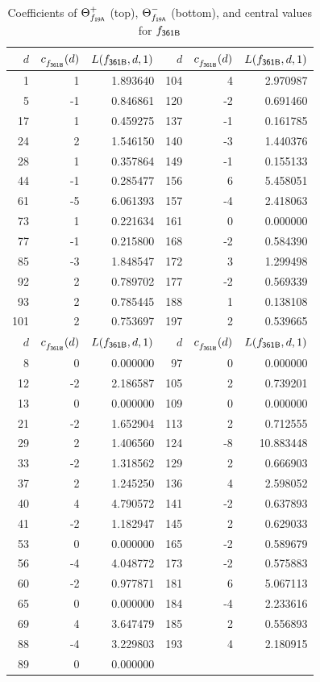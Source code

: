 \begin{table}
\begin{tabular}{||r|rr||r|rr||}
\hline
$d$ & $c^{}_{f_\mathsf{{361B}}}(d)$ & $L(f_\mathsf{{361B}},d,1)$& $d$ & $c^{}_{f_\mathsf{{361B}}}(d)$ & $L(f_\mathsf{{361B}},d,1)$\\
\hline
   1 & 1 & 1.893640 & 104 & 4 & 2.970987 \\
   5 & -1 & 0.846861 & 120 & -2 & 0.691460 \\
   17 & 1 & 0.459275 & 137 & -1 & 0.161785 \\
   24 & 2 & 1.546150 & 140 & -3 & 1.440376 \\
   28 & 1 & 0.357864 & 149 & -1 & 0.155133 \\
   44 & -1 & 0.285477 & 156 & 6 & 5.458051 \\
   61 & -5 & 6.061393 & 157 & -4 & 2.418063 \\
   73 & 1 & 0.221634 & 161 & 0 & 0.000000 \\
   77 & -1 & 0.215800 & 168 & -2 & 0.584390 \\
   85 & -3 & 1.848547 & 172 & 3 & 1.299498 \\
   92 & 2 & 0.789702 & 177 & -2 & 0.569339 \\
   93 & 2 & 0.785445 & 188 & 1 & 0.138108 \\
   101 & 2 & 0.753697 & 197 & 2 & 0.539665 \\
\hline
$d$ & $c^{}_{f_\mathsf{{361B}}}(d)$ & $L(f_\mathsf{{361B}},d,1)$& $d$ & $c^{}_{f_\mathsf{{361B}}}(d)$ & $L(f_\mathsf{{361B}},d,1)$\\
\hline
   8 & 0 & 0.000000 & 97 & 0 & 0.000000 \\
   12 & -2 & 2.186587 & 105 & 2 & 0.739201 \\
   13 & 0 & 0.000000 & 109 & 0 & 0.000000 \\
   21 & -2 & 1.652904 & 113 & 2 & 0.712555 \\
   29 & 2 & 1.406560 & 124 & -8 & 10.883448 \\
   33 & -2 & 1.318562 & 129 & 2 & 0.666903 \\
   37 & 2 & 1.245250 & 136 & 4 & 2.598052 \\
   40 & 4 & 4.790572 & 141 & -2 & 0.637893 \\
   41 & -2 & 1.182947 & 145 & 2 & 0.629033 \\
   53 & 0 & 0.000000 & 165 & -2 & 0.589679 \\
   56 & -4 & 4.048772 & 173 & -2 & 0.575883 \\
   60 & -2 & 0.977871 & 181 & 6 & 5.067113 \\
   65 & 0 & 0.000000 & 184 & -4 & 2.233616 \\
   69 & 4 & 3.647479 & 185 & 2 & 0.556893 \\
   88 & -4 & 3.229803 & 193 & 4 & 2.180915 \\
   89 & 0 & 0.000000 & & &  \\
\hline
\end{tabular}
\caption{Coefficients of
${\Theta}^+_{f_\mathsf{{19A}}}$ (top),
${\Theta}^-_{f_\mathsf{{19A}}}$ (bottom), and central values for $f_\mathsf{{361B}}$
          \label{table:dlcs:19A}}
\end{table}
